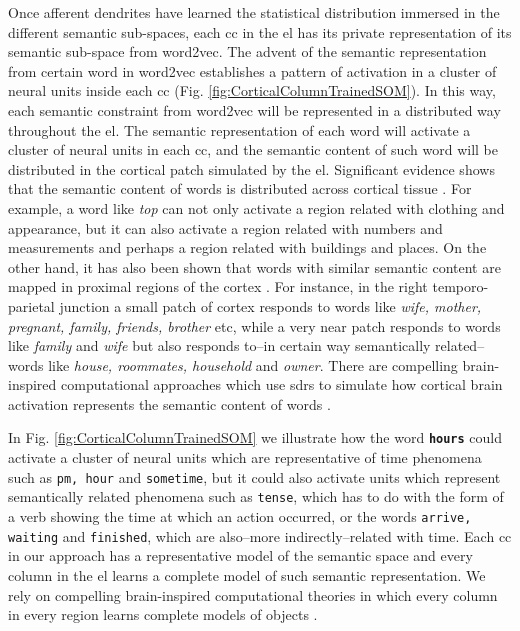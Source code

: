 {Once afferent dendrites have learned the statistical distribution immersed in the different semantic sub-spaces, each \gls{cc} in the \gls{el} has its private representation of its semantic sub-space from word2vec. The advent of the semantic representation from certain word in word2vec establishes a pattern of activation in a cluster of neural units inside each \gls{cc} (Fig. \ref{fig:CorticalColumnTrainedSOM}). In this way, each semantic constraint from word2vec will be represented in a distributed way throughout the \gls{el}. The semantic representation of each word will activate a cluster of neural units in each \gls{cc}, and the semantic content of such word will be distributed in the cortical patch simulated by the \gls{el}. Significant evidence shows that the semantic content of words is distributed across cortical tissue \cite{huth_natural_2016}. For example, a word like \emph{top} can not only activate a region related with clothing and appearance, but it can also activate a region related with numbers and measurements and perhaps a region related with buildings and places. On the other hand, it has also been shown that words with similar semantic content are mapped in proximal regions of the cortex \cite{pub.1005704802}. For instance, in the right temporo-parietal junction a small patch of cortex responds to words like \emph{wife, mother, pregnant, family, friends, brother} etc, while a very near patch responds to words like \emph{family} and \emph{wife} but also responds to--in certain way semantically related--words like \emph{house, roommates, household} and \emph{owner}. There are compelling brain-inspired computational approaches which use \glspl{sdr} to simulate how cortical brain activation represents the semantic content of words \cite{DBLP:journals/corr/Webber15}.

In Fig. \ref{fig:CorticalColumnTrainedSOM} we illustrate how the word \textbf{\texttt{hours}} could activate a cluster of neural units which are representative of time phenomena such as \texttt{pm, hour} and \texttt{sometime}, but it could also  activate units which represent semantically related phenomena such as \texttt{tense}, which has to do with the form of a verb showing the time at which an action occurred, or the words \texttt{arrive, waiting} and \texttt{finished}, which are also--more indirectly--related with time. Each \gls{cc} in our approach has a representative model of the semantic space and every column in the \gls{el} learns a complete model of such semantic representation. We rely on compelling brain-inspired computational theories in which every column in every region learns complete models of objects \cite{10.3389/fncir.2018.00121}.  

}
